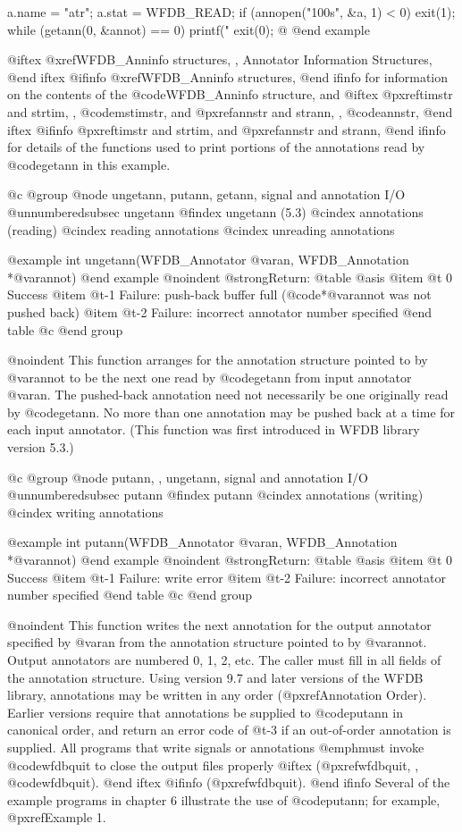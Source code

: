 {{{{{{{{{{    a.name = "atr"; a.stat = WFDB_READ;
    if (annopen("100s", &a, 1) < 0)
        exit(1);
    while (getann(0, &annot) == 0)
        printf("%
    exit(0);
@}
@end example

@iftex
@xref{WFDB_Anninfo structures, , Annotator Information Structures},
@end iftex
@ifinfo
@xref{WFDB_Anninfo structures},
@end ifinfo
for information on the contents of the @code{WFDB_Anninfo} structure,
and
@iftex
@pxref{timstr and strtim, , @code{mstimstr}}, and
@pxref{annstr and strann, , @code{annstr}},
@end iftex
@ifinfo
@pxref{timstr and strtim}, and @pxref{annstr and strann},
@end ifinfo
for details of the functions used to print portions of the annotations
read by @code{getann} in this example.

@c @group
@node     ungetann, putann, getann, signal and annotation I/O
@unnumberedsubsec ungetann
@findex ungetann (5.3)
@cindex annotations (reading)
@cindex reading annotations
@cindex unreading annotations

@example
int ungetann(WFDB_Annotator @var{an}, WFDB_Annotation *@var{annot})
@end example
@noindent
@strong{Return:}
@table @asis
@item @t{ 0}
Success
@item @t{-1}
Failure: push-back buffer full (@code{*@var{annot}} was not pushed back)
@item @t{-2}
Failure: incorrect annotator number specified
@end table
@c @end group

@noindent
This function arranges for the annotation structure pointed to by
@var{annot} to be the next one read by @code{getann} from input
annotator @var{an}.  The pushed-back annotation need not necessarily be
one originally read by @code{getann}.  No more than one annotation may
be pushed back at a time for each input annotator.  (This function was
first introduced in WFDB library version 5.3.)

@c @group
@node     putann, , ungetann, signal and annotation I/O
@unnumberedsubsec putann
@findex putann
@cindex annotations (writing)
@cindex writing annotations

@example
int putann(WFDB_Annotator @var{an}, WFDB_Annotation *@var{annot})
@end example
@noindent
@strong{Return:}
@table @asis
@item @t{ 0}
Success
@item @t{-1}
Failure: write error
@item @t{-2}
Failure: incorrect annotator number specified
@end table
@c @end group

@noindent
This function writes the next annotation for the output annotator specified by
@var{an} from the annotation structure pointed to by @var{annot}.  Output
annotators are numbered 0, 1, 2, etc.  The caller must fill in all fields of
the annotation structure.  Using version 9.7 and later versions of the WFDB
library, annotations may be written in any order (@pxref{Annotation Order}).
Earlier versions require that annotations be supplied to @code{putann} in
canonical order, and return an error code of @t{-3} if an out-of-order
annotation is supplied.  All programs that write signals or annotations
@emph{must} invoke @code{wfdbquit} to close the output files properly
@iftex
(@pxref{wfdbquit, , @code{wfdbquit}}).
@end iftex
@ifinfo
(@pxref{wfdbquit}).
@end ifinfo
Several of the example programs in chapter 6 illustrate the use of
@code{putann}; for example, @pxref{Example 1}.

}}}}}}}}}

